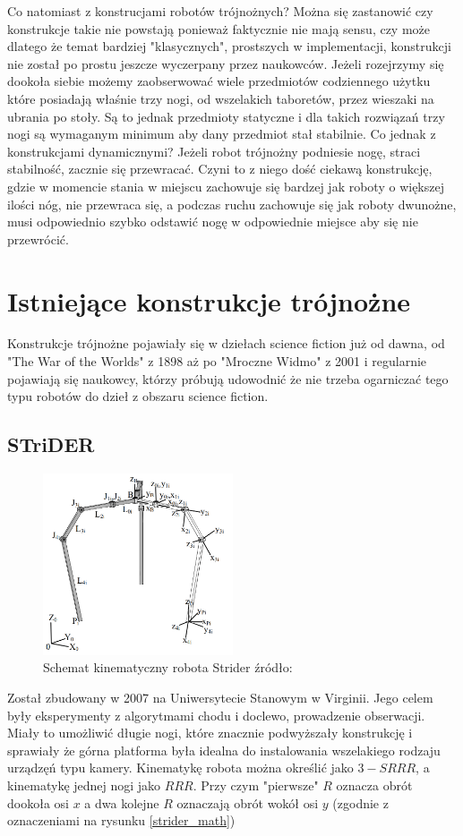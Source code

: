 Co natomiast z konstrucjami robotów trójnożnych? Można się zastanowić czy konstrukcje takie nie powstają ponieważ faktycznie nie mają sensu, czy może dlatego że temat bardziej "klasycznych", prostszych w implementacji, konstrukcji nie został po prostu jeszcze wyczerpany przez naukowców. Jeżeli rozejrzymy się dookoła siebie możemy zaobserwować wiele przedmiotów codziennego użytku które posiadają właśnie trzy nogi, od wszelakich taboretów, przez wieszaki na ubrania po stoły. Są to jednak przedmioty statyczne i dla takich rozwiązań trzy nogi są wymaganym minimum aby dany przedmiot stał stabilnie. Co jednak z konstrukcjami dynamicznymi? Jeżeli robot trójnożny podniesie nogę, straci stabilność, zacznie się przewracać. Czyni to z niego dość ciekawą konstrukcję, gdzie w momencie stania w miejscu zachowuje się bardzej jak roboty o większej ilości nóg, nie przewraca się, a podczas ruchu zachowuje się jak roboty dwunożne, musi odpowiednio szybko odstawić nogę w odpowiednie miejsce aby się nie przewrócić.\\

\section{Istniejące konstrukcje trójnożne}
Konstrukcje trójnożne pojawiały się w dziełach science fiction już od dawna, od "The War of the Worlds" z 1898 aż po "Mroczne Widmo" z 2001 i regularnie pojawiają się naukowcy, którzy próbują udowodnić że nie trzeba ogarniczać tego typu robotów do dzieł z obszaru science fiction.\\
\subsection{STriDER}
\begin{figure}[h!]
\centering
\includegraphics[width=0.5\textwidth]{img/strider_photo.png}
\caption{Schemat kinematyczny robota Strider źródło: \cite{strider}}
\label{martian_photo}
\end{figure}
Został zbudowany w 2007 na Uniwersytecie Stanowym w Virginii. Jego celem były eksperymenty z algorytmami chodu i doclewo, prowadzenie obserwacji. Miały to umożliwić długie nogi, które znacznie podwyższały konstrukcję i sprawiały że górna platforma była idealna do instalowania wszelakiego rodzaju urządzęń typu kamery. Kinematykę robota można określić jako $3-SRRR$, a kinematykę jednej nogi jako $RRR$. Przy czym "pierwsze" $R$ oznacza obrót dookoła osi $x$ a dwa kolejne $R$ oznaczają obrót wokół osi $y$ (zgodnie z oznaczeniami na rysunku \ref{strider_math})  \cite{strider}\\

